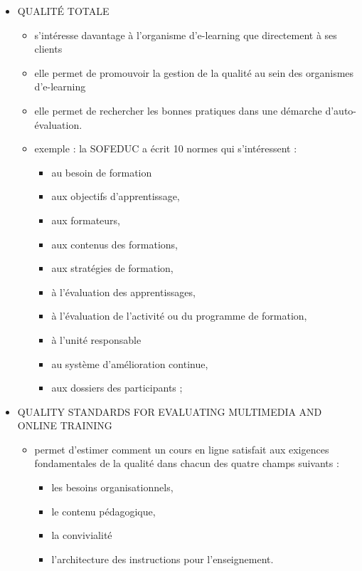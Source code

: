 \begin{frame}[allowframebreaks]
\begin{description}
\begin{itemize}
							\framebreak
							
							\item QUALITÉ TOTALE  
								\begin{itemize}
								\item s’intéresse davantage à l’organisme d’e-learning que directement à ses clients
								\item elle permet de promouvoir la gestion de la qualité au sein des organismes d’e-learning
								\item elle permet de rechercher les bonnes pratiques dans une démarche d’auto-évaluation. 									
								\framebreak
								
								\item exemple : la SOFEDUC a écrit 10 normes qui s’intéressent :
								 	\begin{itemize} 
								 	\item au besoin de formation
								 	\item aux objectifs d’apprentissage,
								 	\item aux formateurs,
								 	\item aux contenus des formations,
								 	\item aux stratégies de formation,
								 	\item à l’évaluation des apprentissages,
								 	\item à l’évaluation de l’activité ou du programme de formation,
								 	\item à l’unité responsable
								 	\item au système d’amélioration continue,
								 	\item aux dossiers des participants ;
								 	\end{itemize}
								 \end{itemize}
							
							\framebreak
							
							\item QUALITY STANDARDS FOR EVALUATING MULTIMEDIA AND ONLINE TRAINING  
								\begin{itemize}
								\item permet d’estimer comment un cours en ligne satisfait aux exigences fondamentales de la qualité dans chacun des quatre champs suivants : 
									\begin{itemize}
									\item les besoins organisationnels,
									\item le contenu pédagogique,
									\item la convivialité
									\item l’architecture des instructions pour l’enseignement. 
									\end{itemize}
								\end{itemize}
							

\end{itemize}
\end{description}
\end{frame}
